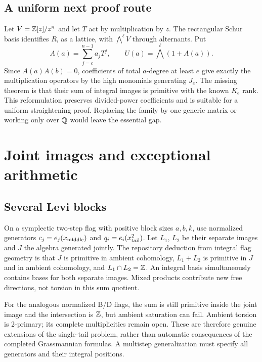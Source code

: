 \subsection{A uniform next proof route}
Let $V=\mathbb Z[z]/z^n$ and let $T$ act by multiplication by $z$. The rectangular Schur basis identifies $R$, as a lattice, with $\bigwedge^\ell V$ through alternants. Put
\[
 A(a)=\sum_{j=c}^{n-1}a_jT^j,\qquad
 U(a)=\bigwedge^\ell(1+A(a)).
\]
Since $A(a)A(b)=0$, coefficients of total $a$-degree at least $e$ give exactly the multiplication operators by the high monomials generating $J_e$. The missing theorem is that their sum of integral images is primitive with the known $K_e$ rank. This reformulation preserves divided-power coefficients and is suitable for a uniform straightening proof. Replacing the family by one generic matrix or working only over $\mathbb Q$ would leave the essential gap.


\section{Joint images and exceptional arithmetic}
\subsection{Several Levi blocks}
On a symplectic two-step flag with positive block sizes $a,b,k$, use normalized generators $c_j=e_j(x_{\rm middle})$ and $q_i=e_i(x_{\rm tail}^2)$. Let $L_1$, $L_2$ be their separate images and $J$ the algebra generated jointly. The repository deduction from integral flag geometry is that $J$ is primitive in ambient cohomology, $L_1+L_2$ is primitive in $J$ and in ambient cohomology, and $L_1\cap L_2=\mathbb Z$. An integral basis simultaneously contains bases for both separate images. Mixed products contribute new free directions, not torsion in this sum quotient.

For the analogous normalized B/D flags, the sum is still primitive inside the joint image and the intersection is $\mathbb Z$, but ambient saturation can fail. Ambient torsion is 2-primary; its complete multiplicities remain open. These are therefore genuine extensions of the single-tail problem, rather than automatic consequences of the completed Grassmannian formulas. A multistep generalization must specify all generators and their integral positions.

